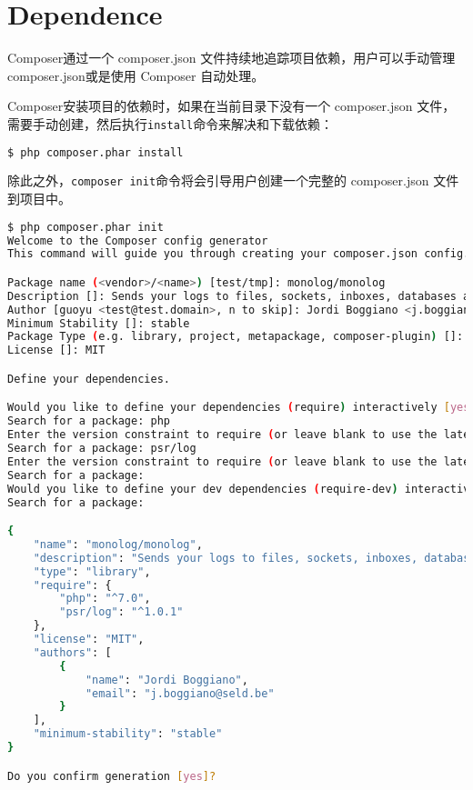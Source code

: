 \section{Dependence}

Composer通过一个 composer.json 文件持续地追踪项目依赖，用户可以手动管理composer.json或是使用 Composer 自动处理。

Composer安装项目的依赖时，如果在当前目录下没有一个 composer.json 文件，需要手动创建，然后执行\texttt{install}命令来解决和下载依赖：


\begin{lstlisting}[language=bash]
$ php composer.phar install
\end{lstlisting}

除此之外，\texttt{composer init}命令将会引导用户创建一个完整的 composer.json 文件到项目中。

\begin{lstlisting}[language=bash]
$ php composer.phar init
Welcome to the Composer config generator
This command will guide you through creating your composer.json config.

Package name (<vendor>/<name>) [test/tmp]: monolog/monolog
Description []: Sends your logs to files, sockets, inboxes, databases and various web services
Author [guoyu <test@test.domain>, n to skip]: Jordi Boggiano <j.boggiano@seld.be>
Minimum Stability []: stable
Package Type (e.g. library, project, metapackage, composer-plugin) []: library
License []: MIT

Define your dependencies.

Would you like to define your dependencies (require) interactively [yes]? yes
Search for a package: php
Enter the version constraint to require (or leave blank to use the latest version): ^7.0
Search for a package: psr/log
Enter the version constraint to require (or leave blank to use the latest version): ^1.0.1
Search for a package: 
Would you like to define your dev dependencies (require-dev) interactively [yes]? 
Search for a package: 

{
    "name": "monolog/monolog",
    "description": "Sends your logs to files, sockets, inboxes, databases and various web services",
    "type": "library",
    "require": {
        "php": "^7.0",
        "psr/log": "^1.0.1"
    },
    "license": "MIT",
    "authors": [
        {
            "name": "Jordi Boggiano",
            "email": "j.boggiano@seld.be"
        }
    ],
    "minimum-stability": "stable"
}

Do you confirm generation [yes]?
\end{lstlisting}


